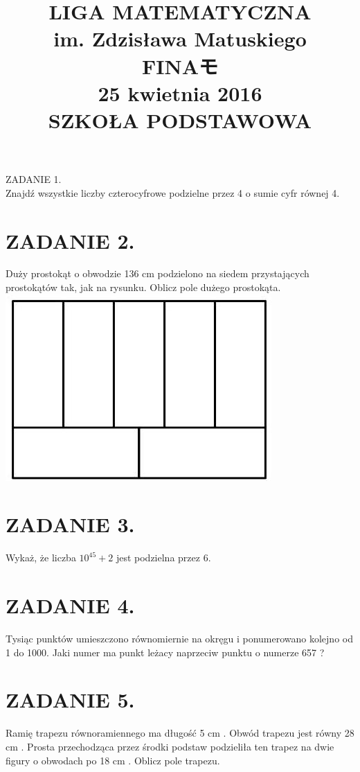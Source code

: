 \documentclass[10pt]{article}
\title{LIGA MATEMATYCZNA \\
 im. Zdzisława Matuskiego \\
 FINAモ \\
 25 kwietnia 2016 \\
 SZKOŁA PODSTAWOWA }
\author{}
\date{}
\begin{document}
\maketitle
ZADANIE 1.\\
Znajdź wszystkie liczby czterocyfrowe podzielne przez 4 o sumie cyfr równej 4.

\section*{ZADANIE 2.}
Duży prostokąt o obwodzie 136 cm podzielono na siedem przystających prostokątów tak, jak na rysunku. Oblicz pole dużego prostokąta.\\
\includegraphics[max width=\textwidth, center]{2024_11_21_3b7d6c9f839d6cd4746cg-1}

\section*{ZADANIE 3.}
Wykaż, że liczba \(10^{45}+2\) jest podzielna przez 6.

\section*{ZADANIE 4.}
Tysiąc punktów umieszczono równomiernie na okręgu i ponumerowano kolejno od 1 do 1000. Jaki numer ma punkt leżacy naprzeciw punktu o numerze 657 ?

\section*{ZADANIE 5.}
Ramię trapezu równoramiennego ma długość 5 cm . Obwód trapezu jest równy 28 cm . Prosta przechodząca przez środki podstaw podzieliła ten trapez na dwie figury o obwodach po 18 cm . Oblicz pole trapezu.
\end{document}

